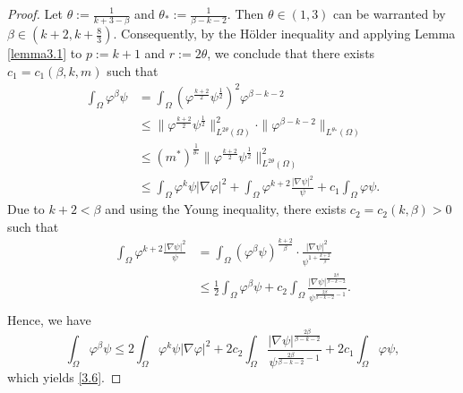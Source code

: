 \documentclass[12pt]{article}
\theoremstyle{plain}
\theoremstyle{definition}
\numberwithin{equation}{section}
\begin{document}
\begin{proof}
    Let
 $\theta:=\frac{1}{k+3-\beta}$ and $ \theta_*:=\frac{1}{\beta-k-2}.$
   Then %
       $ \theta\in (1,3)$
   can be warranted by $\beta \in (k+2,k+\frac{8}{3})$.
Consequently, by the H\"{o}lder inequality and applying  Lemma \ref{lemma3.1} to $p:=k+1$ and $r:=2\theta$,  we conclude that
there exists
$c_1=c_1(\beta,k,m)$ such that
\begin{align*}
    \int_{\Omega}\varphi^{\beta}\psi
    &=\int_{\Omega}(\varphi^{\frac{k+2}{2}}\psi^{\frac{1}{2}})^2\varphi^{\beta-k-2} \nonumber
    \\
    &\leq\|\varphi^{\frac{k+2}{2}}\psi^{\frac{1}{2}}\|^2_{L^{2\theta}(\Omega)}\cdot\|\varphi^{\beta-k-2}\|_{L^{\theta_*}(\Omega)}\nonumber
    \\
    &\leq (m^*)^{\frac{1}{\theta_*}}\|\varphi^{\frac{k+2}{2}}\psi^{\frac{1}{2}}\|^2_{L^{2\theta}(\Omega)}\nonumber
    \\
    &\leq \int_{\Omega}\varphi^{k}\psi|\nabla
    \varphi|^2+  \int_{\Omega}\varphi^{k+2}\frac{|\nabla
    \psi|^2}{\psi}+c_1\int_{\Omega}\varphi \psi.
\end{align*}
Due to $k+2<\beta$ and using the Young inequality, there exists $c_2=c_2(k,\beta)>0$ such that
    \begin{equation*}
        \begin{split}
            \int_\Omega \varphi^{k+2}\frac{|\nabla \psi|^2}{\psi}&=\int_\Omega(\varphi^{\beta}\psi)^{\frac{k+2}{\beta}}\cdot\frac{|\nabla \psi|^2}{\psi^{1+\frac{k+2}{\beta}}}\\
            &\leq \frac{1}{2}\int_\Omega \varphi^{\beta}\psi+c_2\int_\Omega\frac{|\nabla \psi|^{\frac{2\beta}{\beta-k-2}}}{\psi^{\frac{2\beta}{\beta-k-2}-1}}.\\
        \end{split}
    \end{equation*}
      Hence, we have
    \begin{equation*}
        \int_\Omega \varphi^\beta \psi\leq 2\int_{\Omega}\varphi^{k}\psi|\nabla \varphi|^2+2c_2\int_\Omega\frac{|\nabla \psi|^{\frac{2\beta}{\beta-k-2}}}{\psi^{\frac{2\beta}{\beta-k-2}-1}}+2c_1\int_{\Omega}\varphi \psi,
    \end{equation*}
which yields \eqref{3.6}.
\end{proof}
\end{document}
